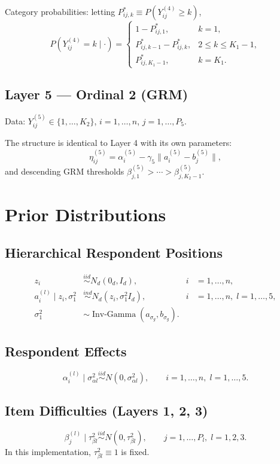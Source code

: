 \documentclass[11pt]{article}
\begin{document}
Category probabilities: letting $P^*_{ij,k} \equiv P(Y_{ij}^{(4)} \geq k)$,
\[
P\!\left(Y_{ij}^{(4)} = k \mid \cdot\right) =
\begin{cases}
1 - P^*_{ij,1}, & k = 1, \\[4pt]
P^*_{ij,k-1} - P^*_{ij,k}, & 2 \leq k \leq K_1 - 1, \\[4pt]
P^*_{ij,K_1-1}, & k = K_1.
\end{cases}
\]

\subsection{Layer 5 --- Ordinal 2 (GRM)}

Data: $Y_{ij}^{(5)} \in \{1,\dots,K_2\}$, $i=1,\dots,n$, $j=1,\dots,P_5$.

The structure is identical to Layer 4 with its own parameters:
\[
\eta_{ij}^{(5)} = \alpha_i^{(5)} - \gamma_5\|a_i^{(5)} - b_j^{(5)}\|,
\]
and descending GRM thresholds $\beta_{j,1}^{(5)} > \cdots > \beta_{j,K_2-1}^{(5)}$.

\section{Prior Distributions}

\subsection{Hierarchical Respondent Positions}

\begin{align*}
z_i &\overset{iid}{\sim} N_d(0_d, I_d), & i&=1,\dots,n, \\
a_i^{(l)} \mid z_i, \sigma_1^2 &\overset{ind}{\sim} N_d(z_i, \sigma_1^2 I_d), & i&=1,\dots,n,\; l=1,\dots,5, \\
\sigma_1^2 &\sim \operatorname{Inv\text{-}Gamma}(a_{\sigma_g}, b_{\sigma_g}).
\end{align*}

\subsection{Respondent Effects}
\[
\alpha_i^{(l)} \mid \sigma_{\alpha l}^2 \overset{iid}{\sim} N(0,\sigma_{\alpha l}^2),
\qquad i=1,\dots,n,\; l=1,\dots,5.
\]

\subsection{Item Difficulties (Layers 1, 2, 3)}
\[
\beta_j^{(l)} \mid \tau_{\beta l}^2 \overset{iid}{\sim} N(0,\tau_{\beta l}^2),
\qquad j=1,\dots,P_l,\; l=1,2,3.
\]
In this implementation, $\tau_{\beta l}^2 \equiv 1$ is fixed.
\end{document}
